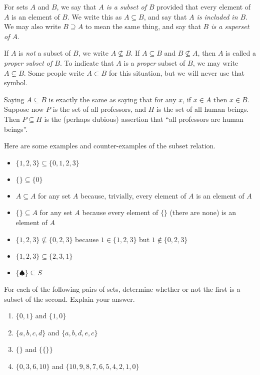 \begin{defn}
  For sets $A$ and $B$, we say that \emph{$A$ is a subset of $B$} provided that every element of $A$ is an element of $B$. We 
  write this as $A\subseteq B$, and say that \emph{$A$ is included in $B$}.  We may also write $B\supseteq A$ 
  to mean the same thing, and say that \emph{$B$ is a superset of $A$}.

  If $A$ is \emph{not} a subset of $B$, we write $A\not\subseteq B$. If $A\subseteq B$ and $B\not\subseteq A$, then $A$ is called a
  \emph{proper subset of $B$}. To indicate that $A$ is a \emph{proper} subset of $B$, we may write $A\subsetneq B$. Some people write $A\subset B$ for this situation, but we will never use that symbol.
\end{defn}

Saying $A\subseteq B$ is exactly the same as saying that for any $x$, if $x\in A$ then $x\in B$. Suppose now $P$ is the set of all professors, and $H$ is the set of all human beings. Then $P\subseteq H$ is the (perhaps dubious) assertion that ``all professors are human beings''. 

\begin{example}
  Here are some examples and counter-examples of the subset relation.
  \begin{itemize}
  \item $\{1,2,3\}\subseteq \{0,1,2,3\}$
  \item $\{\}\subseteq \{0\}$
  \item $A\subseteq A$ for any set $A$ because, trivially, every
    element of $A$ is an element of $A$
  \item $\{\} \subseteq A$ for any set $A$ because every element of
    $\{\}$ (there are none) is an element of $A$
  \item $\{1,2,3\}\not\subseteq \{0,2,3\}$ because $1\in \{1,2,3\}$
    but $1\notin \{0,2,3\}$
  \item $\{1,2,3\}\subseteq \{2,3,1\}$
  \item $\{\spadesuit\} \subseteq S$
  \end{itemize}
\end{example}

\begin{exercises}
	For each of the following pairs of sets, determine whether or
  not the first is a subset of the second. Explain your answer.
  \begin{enumerate}[series=exercises]
  \item $\{0,1\}$ and $\{1,0\}$
  \item $\{a,b,c,d\}$ and $\{a,b,d,e,c\}$
  \item $\{\}$ and $\{\{\}\}$
  \item $\{0,3,6,10\}$ and $\{10,9,8,7,6,5,4,2,1, 0\}$
  \end{enumerate}
\end{exercises}

